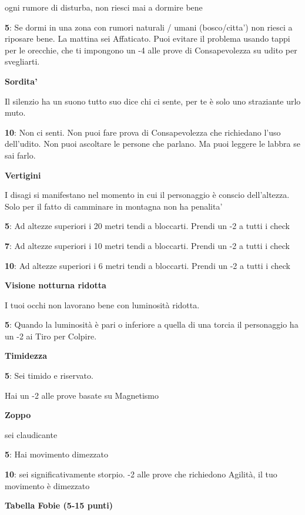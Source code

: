 \documentclass[a4paper,11pt,twoside,openany]{book}
\begin{document}
{ogni rumore di disturba, non riesci mai a dormire bene

\textbf{5}: Se dormi in una zona con rumori naturali / umani (bosco/citta') non riesci a riposare bene. La mattina sei Affaticato. Puoi evitare il problema usando tappi per le orecchie, che ti impongono un -4 alle prove di Consapevolezza su udito per svegliarti.

\textbf{Sordita'}

Il silenzio ha un suono tutto suo dice chi ci sente, per te è solo uno straziante urlo muto.

\textbf{10}: Non ci senti. Non puoi fare prova di Consapevolezza che richiedano l'uso dell'udito. Non puoi ascoltare le persone che parlano. Ma puoi leggere le labbra se sai farlo.

\textbf{Vertigini}

I disagi si manifestano nel momento in cui il personaggio è conscio dell'altezza. Solo per il fatto di camminare in montagna non ha penalita'

\textbf{5}: Ad altezze superiori i 20 metri tendi a bloccarti. Prendi un -2 a tutti i check

\textbf{7}: Ad altezze superiori i 10 metri tendi a bloccarti. Prendi un -2 a tutti i check

\textbf{10}: Ad altezze superiori i 6 metri tendi a bloccarti. Prendi un -2 a tutti i check

\textbf{Visione notturna ridotta}

I tuoi occhi non lavorano bene con luminosità ridotta.

\textbf{5}: Quando la luminosità è pari o inferiore a quella di una torcia il personaggio ha un -2 ai Tiro per Colpire.

\textbf{Timidezza}

\textbf{5}: Sei timido e riservato.

Hai un -2 alle prove basate su Magnetismo

\textbf{Zoppo}

sei claudicante

\textbf{5}: Hai movimento dimezzato

\textbf{10}: sei significativamente storpio. -2 alle prove che richiedono Agilità, il tuo movimento è dimezzato

\bigskip

\textbf{Tabella Fobie (5-15 punti)}

}
\end{document}
